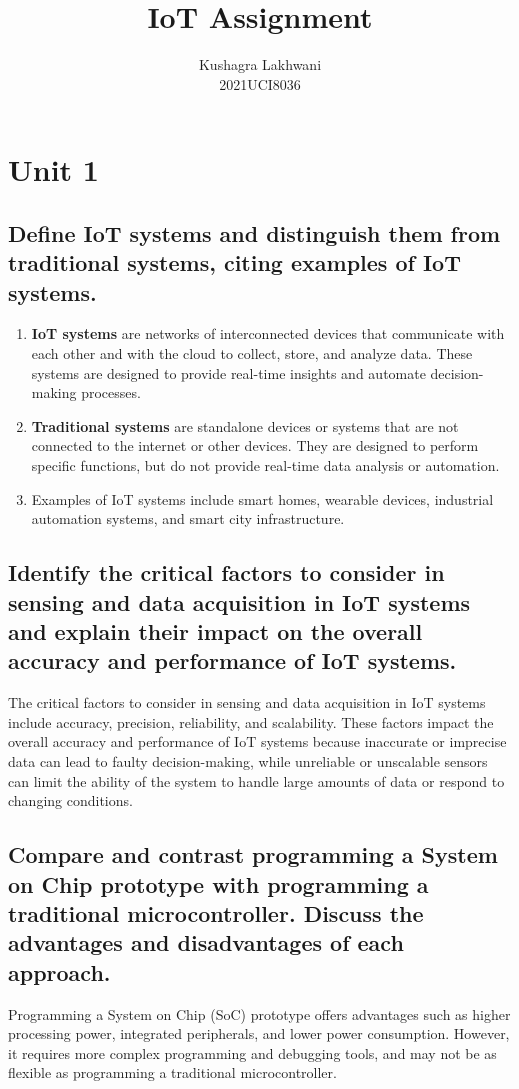 \documentclass[12pt, a4paper, oneside]{article}
\author{Kushagra Lakhwani \\ 2021UCI8036}
\title{IoT Assignment}
\begin{document}
\maketitle

\section{Unit 1}

\subsection{Define IoT systems and distinguish them from traditional systems, citing examples of IoT systems.}
\begin{enumerate}[label=\alph*.]
	\item \textbf{IoT systems} are networks of interconnected devices that communicate with each other and with the cloud to collect, store, and analyze data. These systems are designed to provide real-time insights and automate decision-making processes.
	\item \textbf{Traditional systems} are standalone devices or systems that are not connected to the internet or other devices. They are designed to perform specific functions, but do not provide real-time data analysis or automation.
	\item Examples of IoT systems include smart homes, wearable devices, industrial automation systems, and smart city infrastructure.
\end{enumerate}

\subsection{Identify the critical factors to consider in sensing and data acquisition in IoT systems and explain their impact on the overall accuracy and performance of IoT systems.}
The critical factors to consider in sensing and data acquisition in IoT systems include accuracy, precision, reliability, and scalability. These factors impact the overall accuracy and performance of IoT systems because inaccurate or imprecise data can lead to faulty decision-making, while unreliable or unscalable sensors can limit the ability of the system to handle large amounts of data or respond to changing conditions.

\subsection{Compare and contrast programming a System on Chip prototype with programming a traditional microcontroller. Discuss the advantages and disadvantages of each approach.}
Programming a System on Chip (SoC) prototype offers advantages such as higher processing power, integrated peripherals, and lower power consumption. However, it requires more complex programming and debugging tools, and may not be as flexible as programming a traditional microcontroller.
\end{document}

